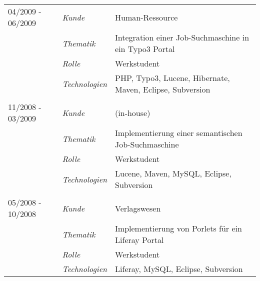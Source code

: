 \begin{longtable}{@{}>{}p{4cm}>{\itshape}p{2cm}>{}p{9cm}}
04/2009 - 06/2009	& Kunde 	    & Human-Ressource\\
\nopagebreak		& Thematik	    & Integration einer Job-Suchmaschine in ein Typo3 Portal\\
\nopagebreak		& Rolle 	    & Werkstudent\\
\nopagebreak		& Technologien	& PHP, Typo3, Lucene, Hibernate, Maven, Eclipse, Subversion\\
\\
11/2008 - 03/2009	& Kunde 	& (in-house)\\
\nopagebreak		& Thematik	& Implementierung einer semantischen Job-Suchmaschine\\
\nopagebreak		& Rolle 	& Werkstudent\\
\nopagebreak		& Technologien	& Lucene, Maven, MySQL, Eclipse, Subversion\\
\\
05/2008 - 10/2008	& Kunde 	& Verlagswesen\\
\nopagebreak		& Thematik	& Implementierung von Porlets für ein Liferay Portal\\
\nopagebreak		& Rolle 	& Werkstudent\\
\nopagebreak		& Technologien	& Liferay, MySQL, Eclipse, Subversion\\
\end{longtable}
\renewcommand{\arraystretch}{2}


